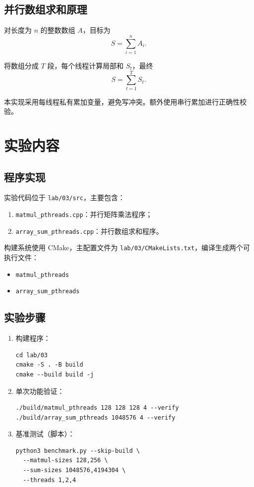 \documentclass[12pt,a4paper]{ctexart}
\begin{document}
\subsection{并行数组求和原理}
对长度为 $n$ 的整数数组 $A$，目标为
\[
S=\sum_{i=1}^{n}A_i.
\]

将数组分成 $T$ 段，每个线程计算局部和 $S_t$，最终
\[
S=\sum_{t=1}^{T}S_t.
\]

本实现采用每线程私有累加变量，避免写冲突。额外使用串行累加进行正确性校验。

\section{实验内容}
\subsection{程序实现}
实验代码位于 \texttt{lab/03/src}，主要包含：
\begin{enumerate}
    \item \texttt{matmul\_pthreads.cpp}：并行矩阵乘法程序；
    \item \texttt{array\_sum\_pthreads.cpp}：并行数组求和程序。
\end{enumerate}

构建系统使用 CMake，主配置文件为 \texttt{lab/03/CMakeLists.txt}，编译生成两个可执行文件：
\begin{itemize}
    \item \texttt{matmul\_pthreads}
    \item \texttt{array\_sum\_pthreads}
\end{itemize}

\subsection{实验步骤}
\begin{enumerate}
    \item 构建程序：
\begin{verbatim}
cd lab/03
cmake -S . -B build
cmake --build build -j
\end{verbatim}

    \item 单次功能验证：
\begin{verbatim}
./build/matmul_pthreads 128 128 128 4 --verify
./build/array_sum_pthreads 1048576 4 --verify
\end{verbatim}

    \item 基准测试（脚本）：
\begin{verbatim}
python3 benchmark.py --skip-build \
  --matmul-sizes 128,256 \
  --sum-sizes 1048576,4194304 \
  --threads 1,2,4
\end{verbatim}
\end{enumerate}
\end{document}
